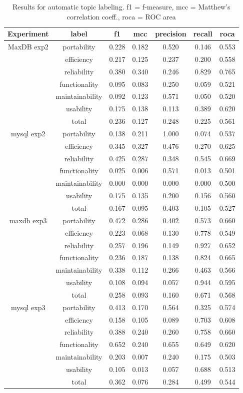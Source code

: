 \documentclass[10pt, conference, compsocconf]{IEEEtran}
\begin{document}
\begin{table*}[h]
	\caption{Results for automatic topic labeling. f1 = f-measure, mcc = Matthew's correlation coeff., roca = ROC area}
	\centering
	\label{tbl:maxdb-unsup-results}
\begin{tabular}{c|c|c|c|c|c|c}
\toprule
Experiment & label & f1 & mcc & precision & recall & roca  \\ 
\midrule
MaxDB exp2 & portability & 0.228 & 0.182 & 0.520 & 0.146 & 0.553 \\ 
 & efficiency & 0.217 & 0.125 & 0.237 & 0.200 & 0.558\\ 
 & reliability & 0.380 & 0.340 & 0.246 & 0.829 & 0.765 \\ 
 & functionality & 0.095 & 0.083 & 0.250 & 0.059 & 0.521 \\ 
 & maintainability & 0.092 & 0.123 & 0.571 & 0.050 & 0.520 \\ 
 & usability & 0.175 & 0.138 & 0.113 & 0.389 & 0.620 \\ 
 & total & 0.236 & 0.127 & 0.248 & 0.225 & 0.561 \\ 
\midrule
mysql exp2 & portability & 0.138 & 0.211 & 1.000 & 0.074 & 0.537 \\ 
 & efficiency & 0.345 & 0.327 & 0.476 & 0.270 & 0.625 \\ 
 & reliability & 0.425 & 0.287 & 0.348 & 0.545 & 0.669 \\ 
 & functionality & 0.025 & 0.006 & 0.571 & 0.013 & 0.501 \\ 
 & maintainability & 0.000 & 0.000 & 0.000 & 0.000 & 0.500 \\ 
 & usability & 0.175 & 0.135 & 0.200 & 0.156 & 0.560 \\ 
 & total & 0.167 & 0.095 & 0.403 & 0.105 & 0.527 \\ 
\midrule
maxdb exp3 & portability & 0.472 & 0.286 & 0.402 & 0.573 & 0.660 \\ 
 & efficiency & 0.223 & 0.068 & 0.130 & 0.778 & 0.549 \\ 
 & reliability & 0.257 & 0.196 & 0.149 & 0.927 & 0.652 \\ 
 & functionality & 0.236 & 0.187 & 0.138 & 0.824 & 0.665 \\ 
 & maintainability & 0.338 & 0.112 & 0.266 & 0.463 & 0.566 \\ 
 & usability & 0.108 & 0.094 & 0.057 & 0.944 & 0.595 \\ 
 & total & 0.258 & 0.093 & 0.160 & 0.671 & 0.568 \\ 
\midrule
mysql exp3 & portability & 0.413 & 0.170 & 0.564 & 0.325 & 0.574 \\ 
 & efficiency & 0.158 & 0.105 & 0.089 & 0.703 & 0.608 \\ 
 & reliability & 0.388 & 0.240 & 0.260 & 0.758 & 0.660 \\ 
 & functionality & 0.652 & 0.240 & 0.655 & 0.649 & 0.620 \\ 
 & maintainability & 0.203 & 0.007 & 0.240 & 0.175 & 0.503 \\ 
 & usability & 0.105 & 0.013 & 0.057 & 0.688 & 0.513 \\ 
 & total & 0.362 & 0.076 & 0.284 & 0.499 & 0.544 \\
\bottomrule
\end{tabular}
\end{table*}
\end{document}
